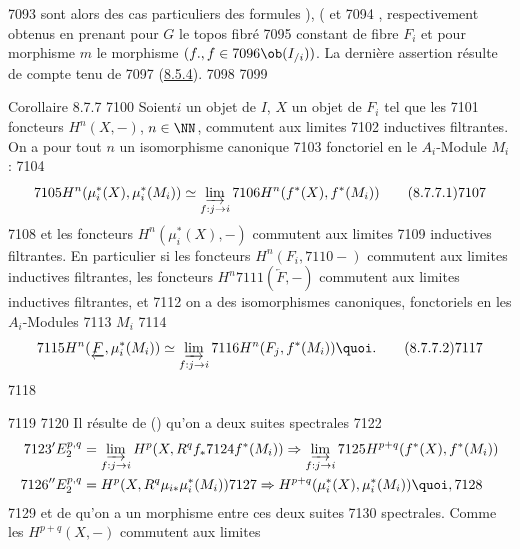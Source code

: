   7093	sont alors des cas particuliers des formules ), ( et
  7094	, respectivement obtenus en prenant pour $G$ le topos fibré
  7095	constant de fibre $F_i$ et pour morphisme $m$ le morphisme $(f., f \in
  7096	\ob (I_{/i}))$. La dernière assertion résulte de  compte tenu de
  7097	(\hyperref[VI.cor8.5.4]{8.5.4}).
  7098	
  7099	\begin{enonce*}{Corollaire 8.7.7}
  7100	Soient\pageoriginale $i$ un objet de $I$, $X$ un objet de $F_i$ tel que les
  7101	foncteurs $H^{n} (X, -)$, $n \in \NN$, commutent aux limites
  7102	inductives filtrantes. On a pour tout $n$ un isomorphisme canonique
  7103	fonctoriel en le $A_i$-Module $M_i$:
  7104	\begin{equation*}
  7105	H^n (\mu_{i}^{\ast}(X), \mu^{\ast}_i (M_i)) \simeq \varinjlim_{f:j\to i}
  7106	H^n (f^{\ast} (X), f^{\ast} (M_i))\tag{8.7.7.1}
  7107	\end{equation*}
  7108	et les foncteurs $H^{n} (\mu^{\ast}_i (X), -)$ commutent aux limites
  7109	inductives filtrantes. En particulier si les foncteurs $H^{n} (F_i,
  7110	-)$ commutent aux limites inductives filtrantes, les foncteurs $H^n
  7111	(\underleftarrow{F}, -)$ commutent aux limites inductives filtrantes, et
  7112	on a des isomorphismes canoniques, fonctoriels en les $A_i$-Modules
  7113	$M_i$
  7114	\begin{equation*}
  7115	H^n (\underleftarrow{F}, \mu_{i}^{\ast} (M_i)) \simeq \varinjlim_{f:j\to i}
  7116	H^n (F_j, f^{\ast} (M_i)){\quoi}.\tag{8.7.7.2}
  7117	\end{equation*}
  7118	\end{enonce*}
  7119	
  7120		Il résulte de () qu'on a deux suites spectrales
  7122	\begin{align*}
  7123	'E_{2}^{p, q} &= \varinjlim_{f:j\to i} H^p(X, R^q f_{\ast}
  7124	f^{\ast} (M_i)) \Rightarrow \varinjlim_{f:j\to i}
  7125	H^{p+q}(f^{\ast} (X), f^{\ast} (M_i))\\
  7126	''E_{2}^{p, q} &=  H^p(X, R^q \mu_{i\ast} \mu^{\ast}_i (M_i))
  7127	\Rightarrow H^{p+q} (\mu^{\ast}_i (X), \mu^{\ast}_i (M_i)){\quoi},
  7128	\end{align*}
  7129	et de  qu'on a un morphisme entre ces deux suites
  7130	spectrales. Comme les $H^{p+q} (X, -)$ commutent aux limites
